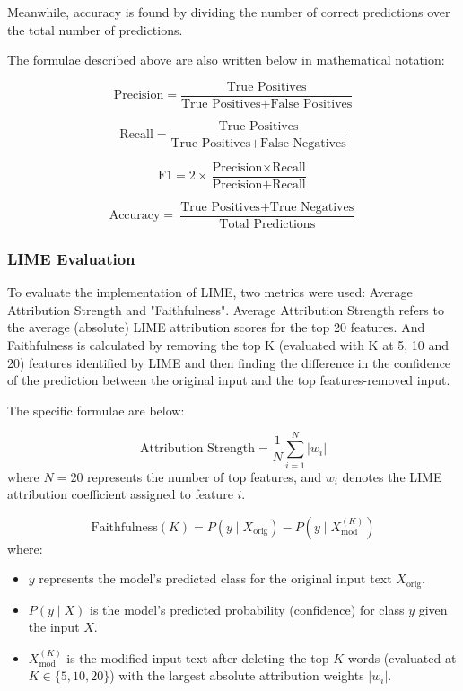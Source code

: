 \documentclass[stu,12pt,floatsintext,donotrepeattitle]{apa7}
\begin{document}
Meanwhile, accuracy is found by dividing the number of correct predictions over the total number of predictions.

The formulae described above are also written below in mathematical notation: 

\begin{equation}
\text{Precision} = \frac{\text{True\ Positives}}{\text{True\ Positives} + \text{False\ Positives}}
\end{equation}

\begin{equation}
\text{Recall} = \frac{\text{True\ Positives}}{\text{True\ Positives} + \text{False\ Negatives}}
\end{equation}

\begin{equation}
\text{F1} = 2 \times \frac{\text{Precision} \times \text{Recall}}{\text{Precision} + \text{Recall}}
\end{equation}

\begin{equation}
\text{Accuracy} = \frac{\text{True\ Positives} + \text{True\ Negatives}}{\text{Total\ Predictions}}
\end{equation}

\subsubsection{LIME Evaluation}
To evaluate the implementation of LIME, two metrics were used: Average Attribution Strength and "Faithfulness". Average Attribution Strength refers to the average (absolute) LIME attribution scores for the top 20 features. And Faithfulness is calculated by removing the top K (evaluated with K at 5, 10 and 20) features identified by LIME and then finding the difference in the confidence of the prediction between the original input and the top features-removed input.

The specific formulae are below:

\begin{equation}
\text{Attribution\ Strength} = \frac{1}{N} \sum_{i=1}^{N} |w_i|
\end{equation}
where $N = 20$ represents the number of top features, and $w_i$ denotes the LIME attribution coefficient assigned to feature $i$.

\begin{equation}
\text{Faithfulness}(K) = P(y \mid X_{\text{orig}}) - P(y \mid X_{\text{mod}}^{(K)})
\end{equation}
where:
\begin{itemize}
    \item $y$ represents the model's predicted class for the original input text $X_{\text{orig}}$.
    \item $P(y \mid X)$ is the model's predicted probability (confidence) for class $y$ given the input $X$.
    \item $X_{\text{mod}}^{(K)}$ is the modified input text after deleting the top $K$ words (evaluated at $K \in \{5, 10, 20\}$) with the largest absolute attribution weights $|w_i|$.
\end{itemize}
\end{document}
